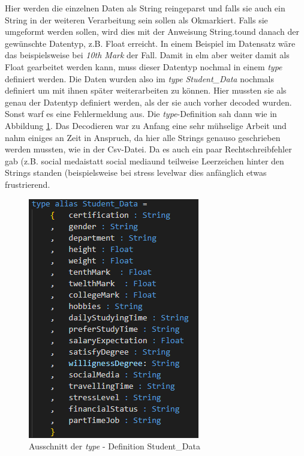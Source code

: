 \documentclass[usegeometry=true]{scrartcl}
\begin{document}
\noindent Hier werden die einzelnen Daten als String reingeparst und falls sie auch ein String in der weiteren Verarbeitung sein sollen als \glqq Ok\grqq markiert. Falls sie umgeformt werden sollen, wird dies mit der Anweisung \glqq String.to\grqq und danach der gewünschte Datentyp, z.B. Float erreicht. In einem Beispiel im Datensatz wäre das beispielsweise bei \textit{10th Mark} der Fall. Damit in elm aber weiter damit als Float gearbeitet werden kann, muss dieser Datentyp nochmal in einem \textit{type} definiert werden. Die Daten wurden also im \textit{type} \textit{Student\_Data} nochmals definiert um mit ihnen später weiterarbeiten zu können. Hier mussten sie als genau der Datentyp definiert werden, als der sie auch vorher decoded wurden. Sonst warf es eine Fehlermeldung aus. Die \textit{type}-Definition sah dann wie in Abbildung \ref{Type}. Das Decodieren war zu Anfang eine sehr mühselige Arbeit und nahm einiges an Zeit in Anspruch, da hier alle Strings genauso geschrieben werden mussten, wie in der Csv-Datei. Da es auch ein paar Rechtschreibfehler gab (z.B. \glqq social medai\grqq statt \glqq social media\grqq und teilweise Leerzeichen hinter den Strings standen (beispielsweise bei \glqq stress level\grqq war dies anfänglich etwas frustrierend. 



\begin{figure}[h]
\begin{center}
	\includegraphics[scale=.75]{typeDef.png}
	\caption{Ausschnitt der \textit{type} - Definition Student\_Data}
	\label{Type}
\end{center}
\end{figure}
\end{document}
